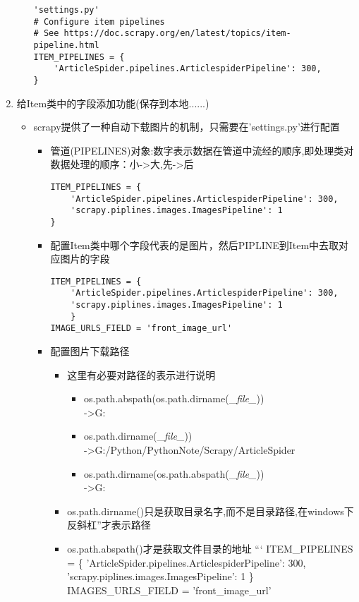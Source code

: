 \documentclass[11pt]{article}
\providecommand{\tightlist}{%
      \setlength{\itemsep}{0pt}\setlength{\parskip}{0pt}}
\begin{document}
\begin{enumerate}
\begin{itemize}
\begin{verbatim}
'settings.py'
# Configure item pipelines
# See https://doc.scrapy.org/en/latest/topics/item-pipeline.html
ITEM_PIPELINES = {
    'ArticleSpider.pipelines.ArticlespiderPipeline': 300,
}
\end{verbatim}
  \end{itemize}
\item
  给Item类中的字段添加功能(保存到本地......)

  \begin{itemize}
  \item
    scrapy提供了一种自动下载图片的机制，只需要在'settings.py'进行配置

    \begin{itemize}
    \item
      管道(PIPELINES)对象:数字表示数据在管道中流经的顺序,即处理类对数据处理的顺序：小-\textgreater{}大,先-\textgreater{}后

\begin{verbatim}
ITEM_PIPELINES = {
    'ArticleSpider.pipelines.ArticlespiderPipeline': 300,
    'scrapy.piplines.images.ImagesPipeline': 1
}
\end{verbatim}
    \item
      配置Item类中哪个字段代表的是图片，然后PIPLINE到Item中去取对应图片的字段

\begin{verbatim}
ITEM_PIPELINES = {
    'ArticleSpider.pipelines.ArticlespiderPipeline': 300,
    'scrapy.piplines.images.ImagesPipeline': 1
    }
IMAGE_URLS_FIELD = 'front_image_url'
\end{verbatim}
    \item
      配置图片下载路径

      \begin{itemize}
      \tightlist
      \item
        这里有必要对路径的表示进行说明

        \begin{itemize}
        \tightlist
        \item
          os.path.abspath(os.path.dirname(\_\emph{file\_}))\\
          -\textgreater{}G:\Python\PythonNote\Scrapy\ArticleSpider
        \item
          os.path.dirname(\_\emph{file\_}))\\
          -\textgreater{}G:/Python/PythonNote/Scrapy/ArticleSpider
        \item
          os.path.dirname(os.path.abspath(\_\emph{file\_}))\\
          -\textgreater{}G:\Python\PythonNote\Scrapy\ArticleSpider
        \end{itemize}
      \item
        os.path.dirname()只是获取目录名字,而不是目录路径,在windows下反斜杠''才表示路径
      \item
        os.path.abspath()才是获取文件目录的地址 ``` ITEM\_PIPELINES = \{
        'ArticleSpider.pipelines.ArticlespiderPipeline': 300,
        'scrapy.piplines.images.ImagesPipeline': 1 \}
        IMAGES\_URLS\_FIELD = 'front\_image\_url'
      \end{itemize}


\end{itemize}
\end{itemize}
\end{enumerate}
\end{document}
